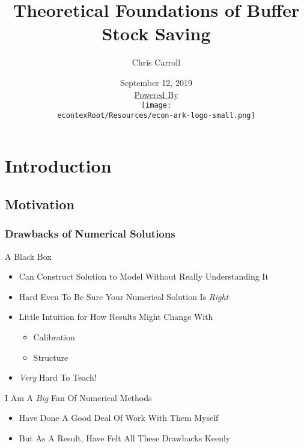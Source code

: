 \documentclass[pdflatex]{beamer}\providecommand{\texname}{BufferStockTheory-Slides}%
\title[Buffer Stock Theory]{Theoretical Foundations of Buffer Stock Saving}
\author[Carroll]{Chris Carroll}
\institute[JHU]{Johns Hopkins University}
\date[\today]{September 12, 2019  \\ \medskip \medskip \medskip \href{https://econ-ark.org/}{\small Powered By} \\ \texttt{[image: \\econtexRoot/Resources/econ-ark-logo-small.png]}}
\begin{document}


\begin{frame}[plain]
  \titlepage
\end{frame}


\section{Introduction}
\subsection{Motivation}

\begin{frame}
\frametitle{Drawbacks of Numerical Solutions}


\pause A Black Box \pause
\begin{itemize}
\item Can Construct Solution to Model Without Really Understanding It
\item Hard Even To Be Sure Your Numerical Solution Is {\it Right}
\item Little Intuition for How Results Might Change With
\begin{itemize}
\item Calibration
\item Structure
\end{itemize}
\item {\it Very} Hard To Teach!
\end{itemize}

\medskip\medskip
\pause I Am A {\it Big} Fan Of Numerical Methods
\begin{itemize}
\item Have Done A Good Deal Of Work With Them Myself
\item But As A Result, Have Felt All These Drawbacks Keenly
\end{itemize}



\end{frame}
\end{document}

